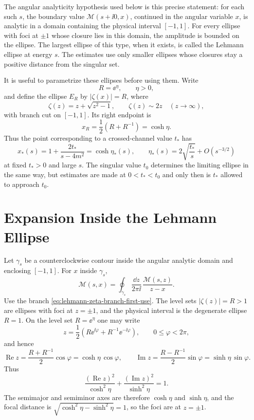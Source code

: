 The angular analyticity hypothesis used below is this precise statement: for
each such \(s\), the boundary value \(\mathcal M(s+\ii0,x)\), continued in
the angular variable \(x\), is analytic in a domain containing the physical
interval \([-1,1]\).  For every ellipse with foci at \(\pm1\) whose closure
lies in this domain, the amplitude is bounded on the ellipse.  The largest
ellipse of this type, when it exists, is called the Lehmann ellipse at energy
\(s\).  The estimates use only smaller ellipses whose closures stay a positive
distance from the singular set.

It is useful to parametrize these ellipses before using them.  Write
\[
  R=\ee^\eta,\qquad \eta>0,
\]
and define the ellipse \(E_R\) by \(|\zeta(x)|=R\), where
\begin{equation}
  \zeta(z)=z+\sqrt{z^2-1},
  \qquad
  \zeta(z)\sim2z\quad(z\to\infty),
  \label{eq:lehmann-zeta-branch-first-use}
\end{equation}
with branch cut on \([-1,1]\).  Its right endpoint is
\[
  x_R=\frac12(R+R^{-1})=\cosh\eta .
\]
Thus the point corresponding to a crossed-channel value \(t_*\) has
\[
  x_*(s)=1+\frac{2t_*}{s-4m^2}=\cosh\eta_*(s),
  \qquad
  \eta_*(s)=2\sqrt{\frac{t_*}{s}}+O(s^{-3/2})
\]
at fixed \(t_*>0\) and large \(s\).  The singular value \(t_0\) determines
the limiting ellipse in the same way, but estimates are made at
\(0<t_*<t_0\) and only then is \(t_*\) allowed to approach \(t_0\).

\section{Expansion Inside the Lehmann Ellipse}

Let \(\gamma_s\) be a counterclockwise contour inside the angular analytic
domain and enclosing \([-1,1]\).  For \(x\) inside \(\gamma_s\),
\[
  \mathcal M(s,x)
  =
  \oint_{\gamma_s}\frac{\dd z}{2\pi\ii}\,
  \frac{\mathcal M(s,z)}{z-x}.
\]
Use the branch \eqref{eq:lehmann-zeta-branch-first-use}.  The level sets
\(|\zeta(z)|=R>1\) are ellipses with foci at \(z=\pm1\), and the physical
interval is the degenerate ellipse \(R=1\).  On the level set \(R=\ee^\eta\)
one may write
\[
  z=\frac12\left(R\ee^{\ii\varphi}+R^{-1}\ee^{-\ii\varphi}\right),
  \qquad 0\le\varphi<2\pi ,
\]
and hence
\[
  \operatorname{Re}z
  =
  \frac{R+R^{-1}}2\cos\varphi
  =
  \cosh\eta\,\cos\varphi,
  \qquad
  \operatorname{Im}z
  =
  \frac{R-R^{-1}}2\sin\varphi
  =
  \sinh\eta\,\sin\varphi .
\]
Thus
\[
  \frac{(\operatorname{Re}z)^2}{\cosh^2\eta}
  +
  \frac{(\operatorname{Im}z)^2}{\sinh^2\eta}
  =
  1 .
\]
The semimajor and semiminor axes are therefore \(\cosh\eta\) and
\(\sinh\eta\), and the focal distance is
\(\sqrt{\cosh^2\eta-\sinh^2\eta}=1\), so the foci are at \(z=\pm1\).

